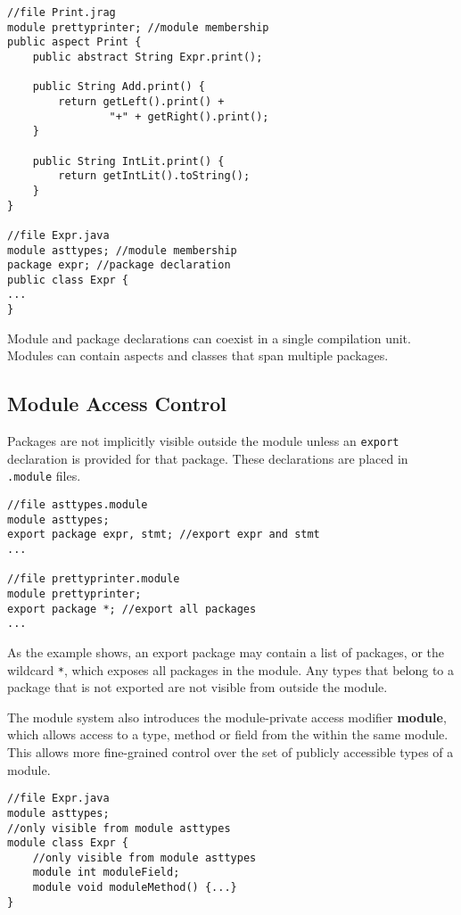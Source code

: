 \begin{lstlisting}[caption={Module Membership}]
//file Print.jrag
module prettyprinter; //module membership
public aspect Print {
	public abstract String Expr.print();
	
	public String Add.print() {
		return getLeft().print() + 
				"+" + getRight().print();
	}
	
	public String IntLit.print() {
		return getIntLit().toString();
	}
}

//file Expr.java
module asttypes; //module membership
package expr; //package declaration
public class Expr {
...
}
\end{lstlisting}

Module and package declarations can coexist in a single compilation unit.
Modules can contain aspects and classes that span multiple packages.

\subsection{Module Access Control}

Packages are not implicitly visible outside the module unless an
\texttt{export} declaration is provided for that package. These declarations
are placed in \texttt{.module} files.

\begin{lstlisting}[caption={Export Package}]
//file asttypes.module
module asttypes;
export package expr, stmt; //export expr and stmt
...

//file prettyprinter.module
module prettyprinter;
export package *; //export all packages
...
\end{lstlisting}

As the example shows, an export package may contain a list of packages, or the
wildcard \texttt{*}, which exposes all packages in the module. Any types that
belong to a package that is not exported are not visible from outside the module.

The module system also introduces the module-private access modifier \textbf{module},
which allows access to a type, method or field from the within the same module. This
allows more fine-grained control over the set of publicly accessible types of a module.

\begin{lstlisting}
//file Expr.java
module asttypes;
//only visible from module asttypes
module class Expr {
	//only visible from module asttypes
	module int moduleField;
	module void moduleMethod() {...}
}
\end{lstlisting}

